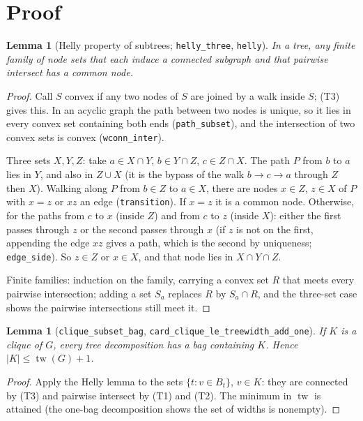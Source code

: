 \documentclass[11pt]{article}
\newtheorem{lemma}[theorem]{Lemma}
\theoremstyle{definition}
\theoremstyle{remark}
\newcommand{\tw}{\operatorname{tw}}
\begin{document}
\section{Proof}

\begin{lemma}[Helly property of subtrees; \texttt{helly\_three}, \texttt{helly}]
In a tree, any finite family of node sets that each induce a connected subgraph and that
pairwise intersect has a common node.
\end{lemma}

\begin{proof}
Call $S$ convex if any two nodes of $S$ are joined by a walk inside $S$; (T3) gives this. In an
acyclic graph the path between two nodes is unique, so it lies in every convex set containing
both ends (\texttt{path\_subset}), and the intersection of two convex sets is convex
(\texttt{wconn\_inter}).

Three sets $X,Y,Z$: take $a\in X\cap Y$, $b\in Y\cap Z$, $c\in Z\cap X$. The path $P$ from $b$ to
$a$ lies in $Y$, and also in $Z\cup X$ (it is the bypass of the walk $b\to c\to a$ through $Z$
then $X$). Walking along $P$ from $b\in Z$ to $a\in X$, there are nodes $x\in Z$, $z\in X$ of
$P$ with $x=z$ or $xz$ an edge (\texttt{transition}). If $x=z$ it is a common node. Otherwise,
for the paths from $c$ to $x$ (inside $Z$) and from $c$ to $z$ (inside $X$): either the first
passes through $z$ or the second passes through $x$ (if $z$ is not on the first, appending the
edge $xz$ gives a path, which is the second by uniqueness; \texttt{edge\_side}). So $z\in Z$ or
$x\in X$, and that node lies in $X\cap Y\cap Z$.

Finite families: induction on the family, carrying a convex set $R$ that meets every pairwise
intersection; adding a set $S_a$ replaces $R$ by $S_a\cap R$, and the three-set case shows the
pairwise intersections still meet it.
\end{proof}

\begin{lemma}[\texttt{clique\_subset\_bag}, \texttt{card\_clique\_le\_treewidth\_add\_one}]
If $K$ is a clique of $G$, every tree decomposition has a bag containing $K$. Hence
$|K|\le \tw(G)+1$.
\end{lemma}

\begin{proof}
Apply the Helly lemma to the sets $\{t: v\in B_t\}$, $v\in K$: they are connected by (T3) and
pairwise intersect by (T1) and (T2). The minimum in $\tw$ is attained (the one-bag
decomposition shows the set of widths is nonempty).
\end{proof}
\end{document}
